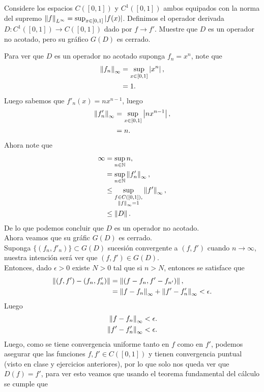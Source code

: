 \begin{homeworkProblem}
  Considere los espacios $C([0,1])$ y $C^{1}([0,1])$ ambos equipados con la norma del supremo $\left\|f\right\|_{L^{\infty}}=\sup_{x\in [0,1]}|f(x)|$. Definimos el operador derivada $D:C^{1}([0,1])\to C([0,1])$ dado por $f\to f'$. Muestre que $D$ es un operador no acotado, pero su gráfico $G(D)$ es cerrado. 
  \begin{solution}
    Para ver que $D$ es un operador no acotado suponga $f_{n}=x^{n}$, note que
    \begin{align*}
      \left\|f_n\right\|_{\infty}&=\sup_{x\in [0,1]}\left| x^{n} \right|,\\
      &=1.
    \end{align*}
    Luego sabemos que $f'_{n}(x)=nx^{n-1}$, luego
    \begin{align*}
      \left\|f'_{n}\right\|_{\infty}&=\sup_{x\in [0,1]}\left| nx^{n-1} \right|,\\
      &=n.
    \end{align*}
    Ahora note que
    \begin{align*}
      \infty&=\sup_{n\in \mathbb{N}}n,\\
      &=\sup_{n\in \mathbb{N}}\left\|f'_{n}\right\|_{\infty},\\
      &\leq \sup_{\substack{f\in C([0,1]),\\\left\|f\right\|_{\infty}=1}}\left\|f'\right\|_{\infty},\\
      &\leq \left\|D\right\|.
    \end{align*}
    De lo que podemos concluir que $D$ es un operador no acotado.\\
    Ahora veamos que su gráfic $G(D)$ es cerrado.\\
    Suponga $\{(f_{n},f'_{n})\}\subset G(D)$ sucesión convergente a $(f,f')$ cuando $n\to\infty$, nuestra intención será ver que $(f,f')\in G(D)$.\\
    Entonces, dado $\epsilon>0$ existe $N>0$ tal que si $n>N$, entonces se satisface que
    \begin{align*}
      \left\|(f,f')-(f_{n},f'_{n})\right\|&=\left\|(f-f_{n},f'-f_{n'})\right\|,\\
      &=\left\|f-f_{n}\right\|_{\infty}+\left\|f'-f_{n}'\right\|_{\infty}<\epsilon.
    \end{align*}
    Luego
    \begin{align*}
      \left\|f-f_{n}\right\|_{\infty}&<\epsilon.\\
      \left\|f'-f'_{n}\right\|_{\infty}&<\epsilon.
    \end{align*}
    Luego, como se tiene convergencia uniforme tanto en $f$ como en $f'$, podemos asegurar que las funciones $f,f'\in C([0,1])$ y tienen convergencia puntual (visto en clase y ejercicios anteriores), por lo que solo nos queda ver que $D(f)=f'$, para ver esto veamos que usando el teorema fundamental del cálculo se cumple que

\end{solution}
\end{homeworkProblem}
